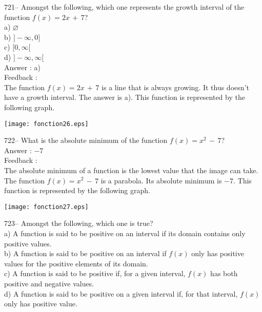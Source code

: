 \documentclass[letterpaper, 12pt]{article}
\begin{document}
721-- Amongst the following, which one represents the growth interval of the function $f(x)=2x\,+\,7$?\\
a) $\varnothing$\\
b) $]-\infty,0]$\\
c) $[0,\infty[$\\
d) $]-\infty,\infty[$\\

Answer : a)\\

Feedback : \\
The function $f(x)=2x\,+\,7$ is a line that is always growing.
It thus doesn't have a growth interval. The answer is a).
This function is represented by the following graph.\\
    \begin{center}
    \texttt{[image: fonction26.eps]}
    \end{center}


722-- What is the absolute minimum of the function $f(x)=x^{2}\,-\,7$?\\

Answer : $-7$\\

Feedback : \\
The absolute minimum of a function is the lowest value that the image can take.\\
The function $f(x)=x^{2}\,-\,7$ is a parabola. Its absolute minimum is $-7$. 
This function is represented by the following graph.\\
    \begin{center}
    \texttt{[image: fonction27.eps]}
    \end{center}


723-- Amongst the following, which one is true?\\
a) A function is said to be positive on an interval if its domain contains only positive values. \\
b) A function is said to be positive on an interval if $f(x)$ only has positive values for the positive elements of its domain.\\
c) A function is said to be positive if, for a given interval, $f(x)$ has both positive and negative values.\\
d) A function is said to be positive on a given interval if, for that interval, $f(x)$ only has positive value.  \\
\end{document}
